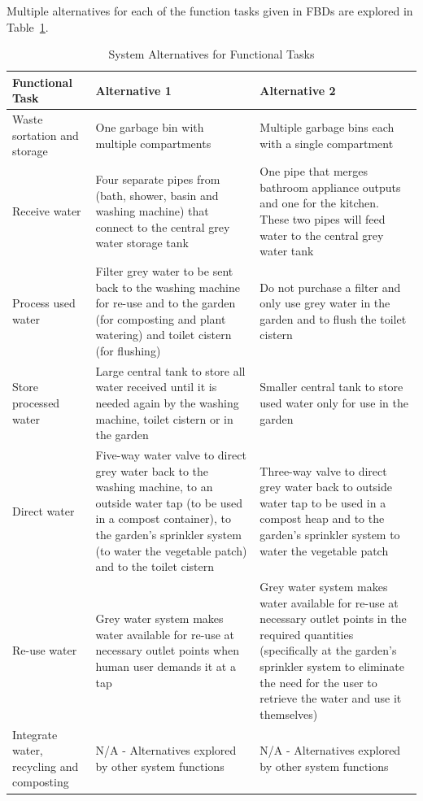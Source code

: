 \documentclass[a4paper,11pt,fleqn]{report}
\begin{document}
{Multiple alternatives for each of the function tasks given in \ac{FBD}s are explored in Table~\ref{tb: FunctionalTasks}.
%
\begin{table}[h!]
\caption {System Alternatives for Functional Tasks} \label{tb: FunctionalTasks} 
\begin{center}
\begin{tabular}{p{3.5cm}|p{6cm}|p{6cm}}\toprule
	{\textbf{Functional Task}} & {\textbf{Alternative 1}} & {\textbf{Alternative 2}}\\ \midrule
    Waste sortation and storage & One garbage bin with multiple compartments & Multiple garbage bins each with a single compartment\\
    \hline
    Receive water & Four separate pipes from (bath, shower, basin and washing machine) that connect to the central grey water storage tank & One pipe that merges bathroom appliance outputs and one for the kitchen. These two pipes will feed water to the central grey water tank\\
    \hline
    Process used water & Filter grey water to be sent back to the washing machine for re-use and to the garden (for composting and plant watering) and toilet cistern (for flushing) & Do not purchase a filter and only use grey water in the garden and to flush the toilet cistern\\
    \hline
    Store processed water & Large central tank to store all water received until it is needed again by the washing machine, toilet cistern or in the garden & Smaller central tank to store used water only for use in the garden\\
    \hline
    Direct water & Five-way water valve to direct grey water back to the washing machine, to an outside water tap (to be used in a compost container), to the garden's sprinkler system (to water the vegetable patch) and to the toilet cistern & Three-way valve to direct grey water back to outside water tap to be used in a compost heap and to the garden's sprinkler system to water the vegetable patch\\
    \hline
    Re-use water & Grey water system makes water available for re-use at necessary outlet points when human user demands it at a tap & Grey water system makes water available for re-use at necessary outlet points in the required quantities (specifically at the garden's sprinkler system to eliminate the need for the user to retrieve the water and use it themselves)\\
    \hline
    Integrate water, recycling and composting & N/A - Alternatives explored by other system functions & N/A - Alternatives explored by other system functions\\

\end{tabular}
\end{center}
\end{table}}
\end{document}
